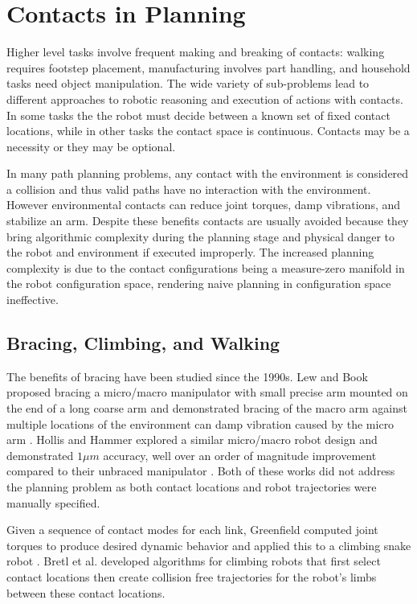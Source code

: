 \documentclass[../thesis.tex]{subfiles}
\begin{document}
\section{Contacts in Planning}

Higher level tasks involve frequent making and breaking of contacts:
walking requires footstep placement, manufacturing involves part handling, and household tasks need object manipulation.
The wide variety of sub-problems lead to different approaches to robotic reasoning and execution of actions with contacts.
In some tasks the the robot must decide between a known set of fixed contact locations, while in other tasks the contact space is continuous.
Contacts may be a necessity or they may be optional.

In many path planning problems, any contact with the environment is considered a collision and thus valid paths have no interaction with the environment.
However environmental contacts can reduce joint torques, damp vibrations, and stabilize an arm.
Despite these benefits contacts are usually avoided because they bring algorithmic complexity during the planning stage and physical danger to the robot and environment if executed improperly.
The increased planning complexity is due to the contact configurations being a measure-zero manifold in the robot configuration space, rendering naive planning in configuration space ineffective. 


\subsection{Bracing, Climbing, and Walking}
The benefits of bracing have been studied since the 1990s.
Lew and Book proposed bracing a micro/macro manipulator with small precise arm mounted on the end of a long coarse arm and demonstrated bracing of the macro arm against multiple locations of the environment can damp vibration caused by the micro arm \cite{Book1994} \cite{Lew1993}.
Hollis and Hammer explored a similar micro/macro robot design and demonstrated $1 \mu m$ accuracy, well over an order of magnitude improvement compared to their unbraced manipulator \cite{Hollis1992}.
Both of these works did not address the planning problem as both contact locations and robot trajectories were manually specified.


Given a sequence of contact modes for each link, Greenfield computed joint torques to produce desired dynamic behavior and applied this to a climbing snake robot \cite{Greenfield2005}.
Bretl et al. \cite{Bretl2006} developed algorithms for climbing robots that first select contact locations then create collision free trajectories for the robot's limbs between these contact locations.
\end{document}
